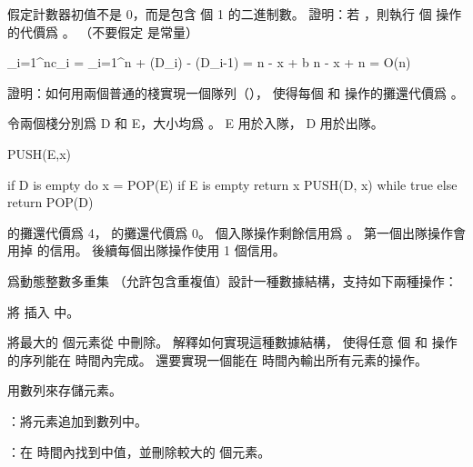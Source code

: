 \startEXERCISE
假定計數器初值不是 0，而是包含  個 1 的二進制數。
證明：若 ，則執行  個  操作的代價爲 。
（不要假定  是常量）
\stopEXERCISE

\startANSWER
\startformula\startmathalignment
\NC \sum_{i=1}^{n}c_i \NC = \sum_{i=1}^{n} + \Phi(D_i) - \Phi(D_{i-1}) \NR
\NC \NC = n - x + b \NR
\NC \NC \le n - x + n \NR
\NC \NC = O(n) \NR
\stopmathalignment\stopformula
\stopANSWER

\startEXERCISE
證明：如何用兩個普通的棧實現一個隊列（），
使得每個  和  操作的攤還代價爲 。
\stopEXERCISE

\startANSWER
令兩個棧分別爲 D 和 E，大小均爲 。 E 用於入隊， D 用於出隊。

\startCLRS
PUSH(E,x)
\stopCLRS

\startCLRS
if D is empty
	do
		x = POP(E)
		if E is empty
			return x
		PUSH(D, x)
	while true
else
	return POP(D)
\stopCLRS

 的攤還代價爲 4，  的攤還代價爲 0。
  個入隊操作剩餘信用爲 。
第一個出隊操作會用掉  的信用。
後續每個出隊操作使用 1 個信用。
\stopANSWER

\startEXERCISE
爲動態整數多重集  （允許包含重複值）設計一種數據結構，支持如下兩種操作：
\startigBase[2]
\item {} 將  插入  中。
\item {} 將最大的  個元素從  中刪除。
\stopigBase
解釋如何實現這種數據結構，
使得任意  個  和  操作的序列能在  時間內完成。
還要實現一個能在  時間內輸出所有元素的操作。
\stopEXERCISE

\startANSWER
用數列來存儲元素。

：將元素追加到數列中。

：在  時間內找到中值，並刪除較大的  個元素。
\stopANSWER

\stopsection

